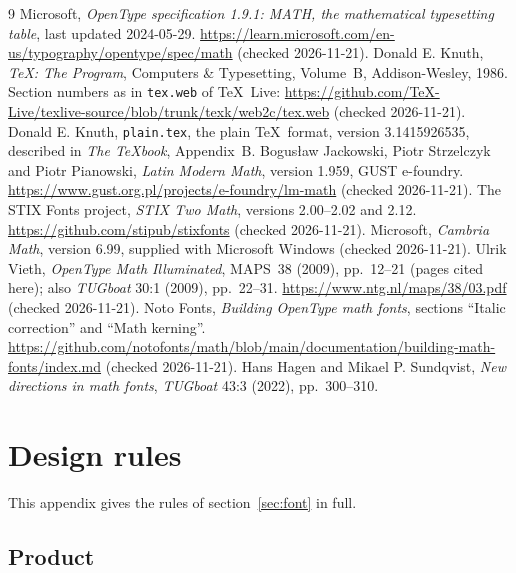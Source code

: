 \documentclass[10pt]{article}
\newcommand\file[1]{\texttt{#1}}
\begin{document}
\begin{thebibliography}{9}
 Microsoft, \emph{OpenType specification 1.9.1:
  MATH, the mathematical typesetting table}, last updated 2024-05-29.
  \url{https://learn.microsoft.com/en-us/typography/opentype/spec/math}
  (checked 2026-11-21).
 Donald E. Knuth, \emph{\TeX: The Program},
  Computers \& Typesetting, Volume~B, Addison-Wesley, 1986.  Section
  numbers as in \file{tex.web} of \TeX\ Live:
  \url{https://github.com/TeX-Live/texlive-source/blob/trunk/texk/web2c/tex.web}
  (checked 2026-11-21).
 Donald E. Knuth, \file{plain.tex}, the plain \TeX\
  format, version 3.1415926535, described in \emph{The \TeX book},
  Appendix~B.
 Bogusław Jackowski, Piotr Strzelczyk and Piotr
  Pianowski, \emph{Latin Modern Math}, version 1.959, GUST e-foundry.
  \url{https://www.gust.org.pl/projects/e-foundry/lm-math}
  (checked 2026-11-21).
 The STIX Fonts project, \emph{STIX Two Math},
  versions 2.00--2.02 and 2.12.
  \url{https://github.com/stipub/stixfonts}
  (checked 2026-11-21).
 Microsoft, \emph{Cambria Math}, version 6.99,
  supplied with Microsoft Windows (checked 2026-11-21).
 Ulrik Vieth, \emph{OpenType Math Illuminated}, MAPS~38
  (2009), pp.~12--21 (pages cited here); also \emph{TUGboat} 30:1
  (2009), pp.~22--31.
  \url{https://www.ntg.nl/maps/38/03.pdf} (checked 2026-11-21).
 Noto Fonts, \emph{Building OpenType math fonts},
  sections ``Italic correction'' and ``Math kerning''.
  \url{https://github.com/notofonts/math/blob/main/documentation/building-math-fonts/index.md}
  (checked 2026-11-21).
 Hans Hagen and Mikael P. Sundqvist,
  \emph{New directions in math fonts}, \emph{TUGboat} 43:3 (2022),
  pp.~300--310.
\end{thebibliography}

\appendix
\clearpage

\section{Design rules}\label{app:rules}

This appendix gives the rules of section~\ref{sec:font} in full.

\subsection{Product}
\end{document}
